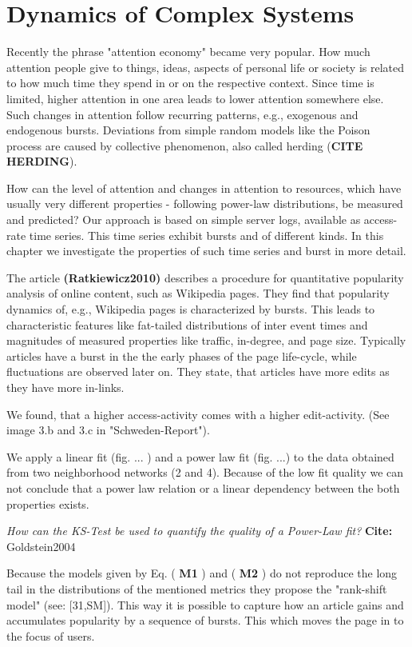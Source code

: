 \documentclass[a4paper,10pt]{scrbook}
\begin{document}
\chapter{Dynamics of Complex Systems}
Recently the phrase "attention economy" became very popular. How much attention people give to things, ideas, aspects of personal life or society is related to how much time they spend in or on the respective context. Since time is limited, higher attention in one area leads to lower attention somewhere else. Such changes in attention follow recurring patterns, e.g., exogenous and endogenous bursts. Deviations from simple random models like the Poison process are caused by collective phenomenon, also called herding (\textbf{CITE HERDING}).  

How can the level of attention and changes in attention to resources, which have usually very different properties - following power-law distributions, be measured and predicted? Our approach is based on simple server logs, available as access-rate time series. This time series exhibit bursts and of different kinds. In this chapter we investigate the properties of such time series and burst in more detail. 

The article \cite{Ratkiewicz2010} \textbf{(Ratkiewicz2010)} describes a procedure for quantitative popularity analysis of online content, such as Wikipedia pages. They find that popularity dynamics of, e.g., Wikipedia pages is characterized by bursts. This leads to characteristic features like fat-tailed distributions of inter event times and magnitudes of measured properties like traffic, in-degree, and page size. Typically articles have a burst in the the early phases of the page life-cycle, while fluctuations are observed later on. They state, that articles have more edits as they have more in-links. 

We found, that a higher access-activity comes with a higher edit-activity.
(See image 3.b and 3.c in "Schweden-Report").



We apply a linear fit (fig. ... ) and a power law fit (fig. ...) to the data obtained from two neighborhood networks (2 and 4). Because of the low fit quality we can not conclude that a power law relation or a linear dependency between the both properties exists. 

\textit{How can the KS-Test be used to quantify the quality of a Power-Law fit?}
\textbf{Cite:} Goldstein2004 \cite{Goldstein2004}

Because the models given by Eq. ( \textbf{M1} ) and ( \textbf{M2} ) do not reproduce the long tail in the distributions of the mentioned metrics they propose the "rank-shift model" (see: [31,SM]). This way it is possible to capture how an article gains and accumulates popularity by a sequence of bursts. This which moves the page in to the focus of users.
\end{document}
